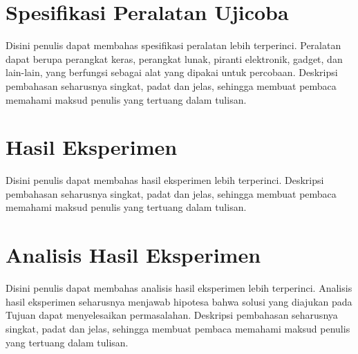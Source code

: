 \section{Spesifikasi Peralatan Ujicoba}

Disini penulis dapat membahas spesifikasi peralatan lebih terperinci. Peralatan
dapat berupa perangkat keras, perangkat lunak, piranti elektronik, gadget, dan
lain-lain, yang berfungsi sebagai alat yang dipakai untuk percobaan. Deskripsi
pembahasan seharusnya singkat, padat dan jelas, sehingga membuat pembaca
memahami maksud penulis yang tertuang dalam tulisan.

\section{Hasil Eksperimen}

Disini penulis dapat membahas hasil eksperimen lebih terperinci. Deskripsi
pembahasan seharusnya singkat, padat dan jelas, sehingga membuat pembaca
memahami maksud penulis yang tertuang dalam tulisan.

\section{Analisis Hasil Eksperimen}

Disini penulis dapat membahas analisis hasil eksperimen lebih terperinci.
Analisis hasil eksperimen seharusnya menjawab hipotesa bahwa solusi yang
diajukan pada Tujuan dapat menyelesaikan permasalahan. Deskripsi pembahasan
seharusnya singkat, padat dan jelas, sehingga membuat pembaca memahami maksud
penulis yang tertuang dalam tulisan.
